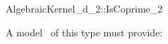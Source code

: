 \begin{ccRefConcept}{AlgebraicKernel_d_2::IsCoprime_2}


A model \ccVar\ of this type must provide:

{}

\ccSeeAlso

\end{ccRefConcept}
